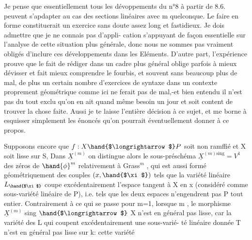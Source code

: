 

Je pense que essentiellement tous les dévoppements du n°8 à
partir de 8.6. peuvent s'apdapter  au cas des sections linéaires avec
m quelconque. Le faire en forme constituerait un exercice sans doute
assez long et fastidieux. Je dois admettre que je ne connais pas d'appli-%
cation s'appuyant de façon essentielle sur l'analyse de cette situation
plus générale, donc nous ne sommes pas vraiment obligés d'inclure ces
développements dans les Eléments. D'autre part, l'expérience prouve que
le fait de rédiger dans un cadre plus général oblige parfois à mieux
dévisser et fait mieux comprendre le fourbis, et souvent sans beaucoup
plus de mal, de plus un certain nombre d'exercices de syntaxe dans un
contexte proprement géométrique comme ici ne ferait pas de mal,-et
bien entendu il n'est pas du tout exclu qu'on en ait quand même besoin
un jour et soit content de trouver la chose faite. Aussi je te laisse
l'entière décision à ce sujet, et me borne à esquisser simplement les
énoncés qu'on pourrait éventuellement donner à ce propos.

Supposons encore que $f:X \hand{$\longrightarrow$} P$ soit non ramffié et X soit lisse sur
S, %
Dans $\underline{X}^{(m)}$  on distingue alors le sous-préschéma $\underline{X}^{(m)\mathrm{sing}} = V^1$
des zéros  de $\hand{\phi}^m$ relativement à Grass$^m$ , qui est aussi formé
géométriquement des couples $(x,\hand{$\xi$})$ tels que la variété linéaire $L_{\hand{$\xi$}}$
coupe excédentairement l'espace tangent à X en x (considéré comme
sous-variété linéaire de P), i.e. tels que les deux espaces n'engendrent
pas P tout entier. Contrairement à ce qui se passe pour m=1, lorsque
m , le morphisme $\underline{X}^{(m)}$ sing $\hand{$\longrightarrow$}$ X n'est en général pas
lisse, car la variété des L qui %
coupent excédentairement une sous-varié-%
té linéaire donnée T n'est en général pas lisse sur k: cette variété

